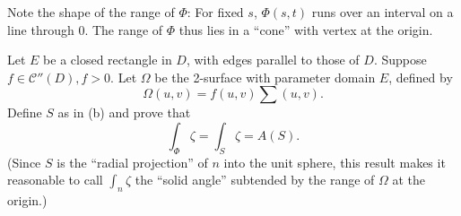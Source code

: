 \begin{myexercise}
\begin{asparaenum}[(a)]
        Note the shape of the range of $\Phi$: 
        For fixed $s$, $\Phi(s, t)$ runs over an interval on a line through 0. 
        The range of $\Phi$ thus lies in a ``cone'' with vertex at the origin.
        \item Let $E$ be a closed rectangle in $D$, with edges parallel to those of $D$. 
        Suppose $f \in \mathscr{C}''(D), f> 0$. 
        Let $\Omega$ be the 2-surface with parameter domain $E$, defined by
        \begin{equation*}
            \Omega(u,v) = f(u,v)\sum(u,v).
        \end{equation*}
        Define $S$ as in (b) and prove that
        \begin{equation*}
            \int_{\Phi} \zeta =  \int_{S} \zeta = A(S).
        \end{equation*}
        (Since $S$ is the ``radial projection'' of $n$ into the unit sphere, this result makes it reasonable to call $\int_n \zeta$ the ``solid angle'' subtended by the range of $\Omega$ at the origin.) 
        

\end{asparaenum}
\end{myexercise}
